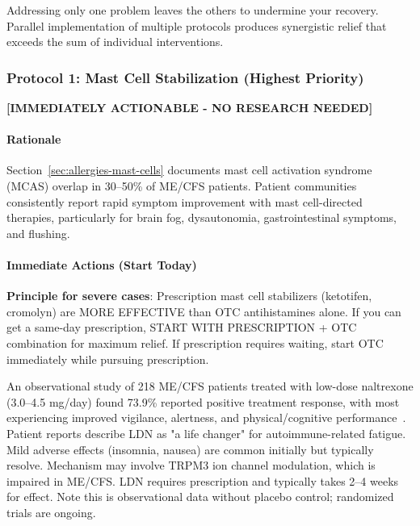 Addressing only one problem leaves the others to undermine your recovery. Parallel implementation of multiple protocols produces synergistic relief that exceeds the sum of individual interventions.

\subsubsection{Protocol 1: Mast Cell Stabilization (Highest Priority)}

\textbf{[IMMEDIATELY ACTIONABLE - NO RESEARCH NEEDED]}

\paragraph{Rationale}
Section~\ref{sec:allergies-mast-cells} documents mast cell activation syndrome (MCAS) overlap in 30--50\% of ME/CFS patients. Patient communities consistently report rapid symptom improvement with mast cell-directed therapies, particularly for brain fog, dysautonomia, gastrointestinal symptoms, and flushing.

\paragraph{Immediate Actions (Start Today)}

\textbf{Principle for severe cases}: Prescription mast cell stabilizers (ketotifen, cromolyn) are MORE EFFECTIVE than OTC antihistamines alone. If you can get a same-day prescription, START WITH PRESCRIPTION + OTC combination for maximum relief. If prescription requires waiting, start OTC immediately while pursuing prescription.

\begin{observation}
\label{obs:ldn-severe}
An observational study of 218 ME/CFS patients treated with low-dose naltrexone (3.0--4.5 mg/day) found 73.9\% reported positive treatment response, with most experiencing improved vigilance, alertness, and physical/cognitive performance~\cite{Polo2019}. Patient reports describe LDN as "a life changer" for autoimmune-related fatigue. Mild adverse effects (insomnia, nausea) are common initially but typically resolve. Mechanism may involve TRPM3 ion channel modulation, which is impaired in ME/CFS. LDN requires prescription and typically takes 2--4 weeks for effect. Note this is observational data without placebo control; randomized trials are ongoing.
\end{observation}

